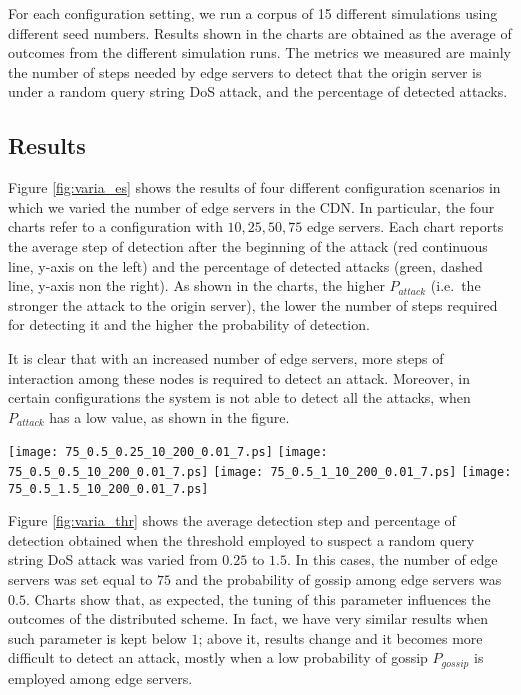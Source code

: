 \documentclass{IEEEtran}
\begin{document}
For each configuration setting, we run a corpus of 15 different simulations using different seed numbers. Results shown in the charts are obtained as the average of outcomes from the different simulation runs. The metrics we measured are mainly the number of steps needed by edge servers to detect that the origin server is under a random query string DoS attack, and the percentage of detected attacks.

\subsection{Results}

Figure \ref{fig:varia_es} shows the results of four different configuration scenarios in which we varied the number of edge servers in the CDN. In particular, the four charts refer to a configuration with $10, 25, 50, 75$ edge servers. Each chart reports the average step of detection after the beginning of the attack (red continuous line, y-axis on the left) and the percentage of detected attacks (green, dashed line, y-axis non the right). As shown in the charts, the higher $P_{attack}$  (i.e.~the stronger the attack to the origin server), the lower the number of steps required for detecting it and the higher the probability of detection.

It is clear that with an increased number of edge servers, more steps of interaction among these nodes is required to detect an attack. Moreover, in certain configurations the system is not able to detect all the attacks, when $P_{attack}$ has a low value, as shown in the figure.

\begin{figure*}[t]
   \centering
   \texttt{[image: 75\_0.5\_0.25\_10\_200\_0.01\_7.ps]}
   \texttt{[image: 75\_0.5\_0.5\_10\_200\_0.01\_7.ps]}
   \texttt{[image: 75\_0.5\_1\_10\_200\_0.01\_7.ps]}
   \texttt{[image: 75\_0.5\_1.5\_10\_200\_0.01\_7.ps]}
   \caption{Average detection step and percentage of detection when varying the threshold to suspect a random query string DoS attack.}
   \label{fig:varia_thr}
 \vspace{-0.2cm}
\end{figure*}

Figure \ref{fig:varia_thr} shows the average detection step and percentage of detection obtained when the threshold employed to suspect a random query string DoS attack was varied from $0.25$ to $1.5$. In this cases, the number of edge servers was set equal to $75$ and the probability of gossip among edge servers was $0.5$. Charts show that, as expected, the tuning of this parameter influences the outcomes of the distributed scheme. In fact, we have very similar results when such parameter is kept below $1$; above it, results change and it becomes more difficult to detect an attack, mostly when a low probability of gossip $P_{gossip}$ is employed among edge servers.
\end{document}
